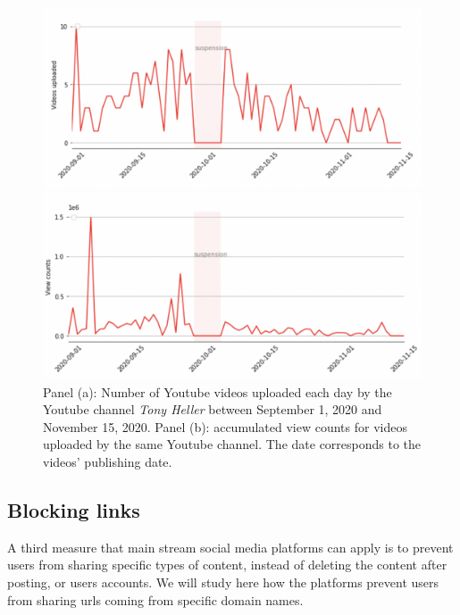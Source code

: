 \documentclass[11pt,a4paper]{article}
\begin{document}
\begin{figure}
	\centering
		\begin{multicols}{1}
			\includegraphics[scale=0.3]{./img/tony/fig1_tony.png}
		\end{multicols}
		
		\begin{multicols}{1}
			\includegraphics[scale=0.3]{./img/tony/fig2_tony.png}
		\end{multicols}
	\caption{Panel (a): Number of Youtube videos uploaded each day by the Youtube channel {\it Tony Heller} between September 1, 2020 and November 15, 2020. Panel (b): accumulated view counts for videos uploaded by the same Youtube channel. The date corresponds to the videos’  publishing date. 
}
	\label{fig1_tony}
\end{figure}



\subsection{Blocking links}

A third measure that main stream social media platforms can apply is to prevent users from sharing specific types of content, instead of deleting the content after posting, or users accounts. We will study here how the platforms prevent users from sharing urls coming from specific domain names.
\end{document}
